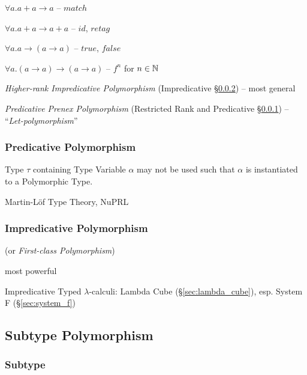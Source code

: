 $\forall a.a + a \rightarrow a$ -- $match$

$\forall a.a + a \rightarrow a + a$ -- $id$, $retag$


$\forall a.a \rightarrow (a \rightarrow a)$ -- $true$, $false$


$\forall a.(a \rightarrow a) \rightarrow (a \rightarrow a)$ -- $f^n$
for $n \in \mathbb{N}$


\asterism


\emph{Higher-rank Impredicative Polymorphism} (Impredicative
\S\ref{sec:impredicative_polymorphism}) -- most general

\emph{Predicative Prenex Polymorphism} (Restricted Rank and
Predicative \S\ref{sec:predicative_polymorphism}) --
``\emph{Let-polymorphism}''



\subsubsection{Predicative Polymorphism}
\label{sec:predicative_polymorphism}

Type $\tau$ containing Type Variable $\alpha$ may not be used such
that $\alpha$ is instantiated to a Polymorphic Type.

Martin-L\"of Type Theory, NuPRL



\subsubsection{Impredicative Polymorphism}
\label{sec:impredicative_polymorphism}

(or \emph{First-class Polymorphism})

most powerful

Impredicative Typed $\lambda$-calculi: Lambda Cube
(\S\ref{sec:lambda_cube}), esp. System F (\S\ref{sec:system_f})



\subsection{Subtype Polymorphism}\label{sec:subtype_polymorphism}


\subsubsection{Subtype}\label{sec:subtype}


